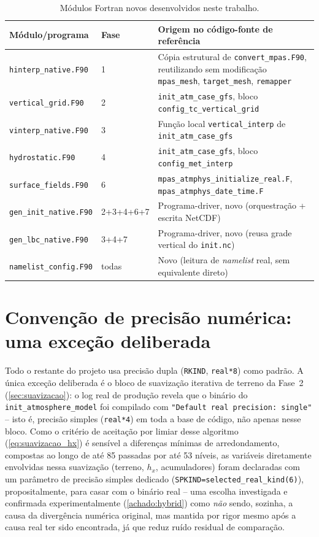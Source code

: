 \begin{table}[H]
\centering
\small
\caption{Módulos Fortran novos desenvolvidos neste trabalho.}
\label{tab:modulos}
\begin{tabular}{@{}p{3.1cm}p{1.3cm}p{6.7cm}@{}}
\toprule
Módulo/programa & Fase & Origem no código-fonte de referência \\
\midrule
\texttt{hinterp\_native.F90} & 1 & Cópia estrutural de \texttt{convert\_mpas.F90}, reutilizando sem modificação \texttt{mpas\_mesh}, \texttt{target\_mesh}, \texttt{remapper} \\
\texttt{vertical\_grid.F90} & 2 & \texttt{init\_atm\_case\_gfs}, bloco \texttt{config\_tc\_vertical\_grid} \\
\texttt{vinterp\_native.F90} & 3 & Função local \texttt{vertical\_interp} de \texttt{init\_atm\_case\_gfs} \\
\texttt{hydrostatic.F90} & 4 & \texttt{init\_atm\_case\_gfs}, bloco \texttt{config\_met\_interp} \\
\texttt{surface\_fields.F90} & 6 & \texttt{mpas\_atmphys\_initialize\_real.F}, \texttt{mpas\_atmphys\_date\_time.F} \\
\texttt{gen\_init\_native.F90} & 2+3+4+6+7 & Programa-driver, novo (orquestração + escrita NetCDF) \\
\texttt{gen\_lbc\_native.F90} & 3+4+7 & Programa-driver, novo (reusa grade vertical do \texttt{init.nc}) \\
\texttt{namelist\_config.F90} & todas & Novo (leitura de \textit{namelist} real, sem equivalente direto) \\
\bottomrule
\end{tabular}
\end{table}

\section{Convenção de precisão numérica: uma exceção deliberada}

Todo o restante do projeto \selfgrib{} usa precisão dupla
(\texttt{RKIND}, \texttt{real*8}) como padrão. A única exceção
deliberada é o bloco de suavização iterativa de terreno da Fase~2
(\cref{sec:suavizacao}): o log real de produção revela que o binário do
\texttt{init\_atmosphere\_model} foi compilado com \texttt{"Default real
precision: single"} -- isto é, precisão simples (\texttt{real*4}) em toda
a base de código, não apenas nesse bloco. Como o critério de aceitação
por limiar desse algoritmo (\cref{eq:suavizacao_hx}) é sensível a
diferenças mínimas de arredondamento, compostas ao longo de até 85
passadas por até 53 níveis, as variáveis diretamente envolvidas nessa
suavização (terreno, $h_x$, acumuladores) foram declaradas com um
parâmetro de precisão simples dedicado
(\texttt{SPKIND=selected\_real\_kind(6)}), propositalmente, para casar
com o binário real -- uma escolha investigada e confirmada
experimentalmente (\cref{achado:hybrid}) como \emph{não} sendo, sozinha,
a causa da divergência numérica original, mas mantida por rigor mesmo
após a causa real ter sido encontrada, já que reduz ruído residual de
comparação.

